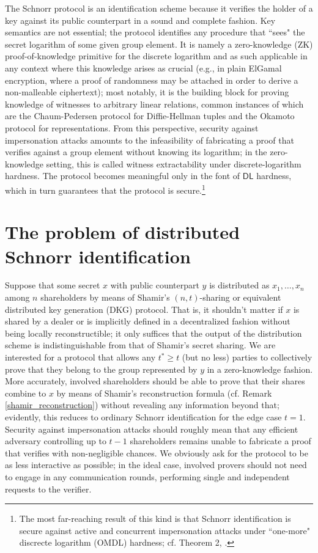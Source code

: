 \documentclass[10pt, psamsfonts, reqno]{amsart}
\theoremstyle{definition}
\theoremstyle{remark}
\numberwithin{equation}{section}
\begin{document}
The Schnorr protocol is an identification scheme
because it verifies the holder of a key
against its public counterpart in a sound and complete fashion.
Key semantics are not essential;
the protocol identifies any procedure
that ``sees" the secret logarithm of some given group element.
It is namely a zero-knowledge (ZK) proof-of-knowledge primitive
for the discrete logarithm and as such applicable in any context where this knowledge arises as crucial
(e.g., in plain ElGamal encryption,
where a proof of randomness
may be attached in order to derive a non-malleable ciphertext);
most notably, it is the building block
for proving knowledge of witnesses to arbitrary linear relations,
common instances of which are
the Chaum-Pedersen protocol for Diffie-Hellman tuples
and the Okamoto protocol for representations.
From this perspective,
security against impersonation attacks
amounts to the infeasibility of fabricating
a proof that verifies against a group element
without knowing its logarithm;
in the zero-knowledge setting,
this is called witness extractability
under discrete-logarithm hardness.
The protocol becomes meaningful
only in the font of $\mathsf{DL}$ hardness,
which in turn guarantees
that the protocol is secure.\footnote{The
most far-reaching result of this kind is that
Schnorr identification is secure
against active and concurrent impersonation attacks
under ``one-more" discrecte logarithm (OMDL) hardness;
cf. Theorem 2, \cite{paper_bellare_palacio}.}

\section{The problem of distributed Schnorr identification}\label{section_problem}

Suppose that some secret $x$
with public counterpart $y$ is distributed as $x_1, \dots, x_n$
among $n$ shareholders by means of Shamir's $(n, t)$-sharing
or equivalent distributed key generation (DKG)
protocol. That is, it shouldn't matter if $x$ is shared by
a dealer or is implicitly defined in a decentralized
fashion without being locally reconstructible;
it only suffices that the output of the
distribution scheme is indistinguishable
from that of Shamir's secret sharing.
We are interested for a protocol that allows any
$t^* \ge t$ (but no less) parties to collectively prove
that they belong to the group represented by $y$
in a zero-knowledge fashion. More accurately, involved shareholders
should be able to prove that their shares
combine to $x$ by means of Shamir's reconstruction formula
(cf. Remark \ref{shamir_reconstruction})
without revealing any information beyond that;
evidently, this reduces to ordinary Schnorr identification
for the edge case $t=1$.
Security against impersonation attacks should roughly mean that any
efficient adversary controlling up to $t-1$ shareholders
remains unable to fabricate a proof that verifies
with non-negligible chances.
We obviously ask for the protocol to be
as less interactive as possible;
in the ideal case, involved provers should not need to
engage in any communication rounds, performing single and
independent requests to the verifier.
\end{document}
